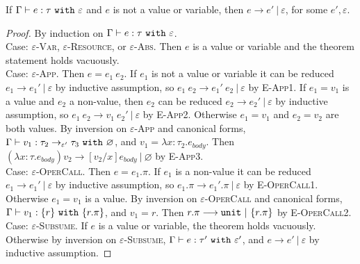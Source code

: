 \documentclass[a4paper,UKenglish]{lipics-v2016}
\begin{document}
\begin{theorem}
If $ \Gamma \vdash  e:  \tau~\mathtt{with}~ \varepsilon$ and $ e$ is not a value or variable, then $ e \longrightarrow  e'~|~\varepsilon$, for some $e', \varepsilon$.
\end{theorem}


\begin{proof} By induction on $ \Gamma \vdash  e:  \tau~\mathtt{with}~ \varepsilon$. \\

Case: \textsc{$\varepsilon$-Var}, \textsc{$\varepsilon$-Resource}, or  \textsc{$\varepsilon$-Abs}. Then $e$ is a value or variable and the theorem statement holds vacuously.\\

Case: \textsc{$\varepsilon$-App}. Then $ e =  e_1~ e_2$. If $ e_1$ is not a value or variable it can be reduced $e_1 \longrightarrow e_1'~|~\varepsilon$ by inductive assumption, so $ e_1~ e_2 \longrightarrow  e_1'~ e_2~|~\varepsilon$ by \textsc{E-App1}. If $ e_1 =  v_1$ is a value and $ e_2$ a non-value, then $e_2$ can be reduced $e_2 \longrightarrow e_2'~|~\varepsilon$ by inductive assumption, so $ e_1~ e_2 \longrightarrow  v_1~ e_2'~|~\varepsilon$ by \textsc{E-App2}. Otherwise $ e_1 = v_1$ and $ e_2 = v_2$ are both values. By inversion on \textsc{$\varepsilon$-App} and canonical forms, $\Gamma \vdash v_1: \tau_2 \rightarrow_{\varepsilon'} \tau_3~\mathtt{with}~ \varnothing$, and $v_1 = \lambda x: \tau_2. e_{body}$. Then $(\lambda x:  \tau.  e_{body})  v_2 \longrightarrow [ v_2/x]e_{body}~|~\varnothing$ by \textsc{E-App3}.\\

Case: \textsc{$\varepsilon$-OperCall}. Then $ e =  e_1.\pi$. If $ e_1$ is a non-value it can be reduced $e_1 \longrightarrow e_1'~|~\varepsilon$ by inductive assumption, so $ e_1.\pi \longrightarrow  e_1'.\pi~|~\varepsilon$ by \textsc{E-OperCall1}. Otherwise $ e_1 =  v_1$ is a value. By inversion on \textsc{$\varepsilon$-OperCall} and canonical forms, $\Gamma \vdash v_1: \{ r \}~\mathtt{with}~ \{ r.\pi \}$, and $v_1 = r$. Then $r.\pi \longrightarrow \mathtt{unit}~|~\{ r.\pi \}$ by \textsc{E-OperCall2}.\\

Case: \textsc{$\varepsilon$-Subsume}. If $e$ is a value or variable, the theorem holds vacuously. Otherwise by inversion on \textsc{$\varepsilon$-Subsume},  $ \Gamma \vdash e:  \tau'~\mathtt{with}~ \varepsilon'$, and $e \longrightarrow e'~|~\varepsilon$ by inductive assumption.

\end{proof}
\end{document}
